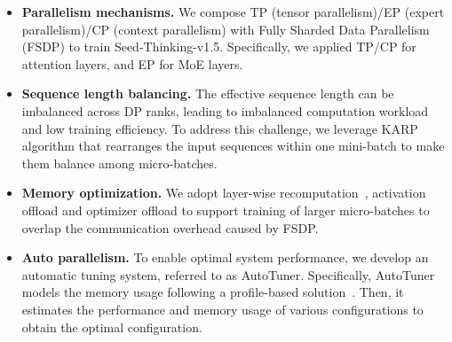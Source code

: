 \begin{itemize}
    \item \textbf{Parallelism mechanisms.} We compose TP (tensor parallelism)/EP (expert parallelism)/CP (context parallelism) with Fully Sharded Data Parallelism (FSDP) to train Seed-Thinking-v1.5. Specifically, we applied TP/CP for attention layers, and EP for MoE layers. 
    \item \textbf{Sequence length balancing.} The effective sequence length can be imbalanced across DP ranks, leading to imbalanced computation workload and low training efficiency. To address this challenge, we leverage KARP~\cite{karp} algorithm that rearranges the input sequences within one mini-batch to make them balance among micro-batches.
    \item \textbf{Memory optimization.} 
We adopt layer-wise recomputation~\cite{recompute}, activation offload and optimizer offload to support training of larger micro-batches to overlap the communication overhead caused by FSDP. 
\item \textbf{Auto parallelism.} To enable optimal system performance, we develop an automatic tuning system, referred to as AutoTuner. 
Specifically, AutoTuner models the memory usage following a profile-based solution~\cite{alpa}. Then, it estimates the performance and memory usage of various configurations to obtain the optimal configuration.


\end{itemize}
